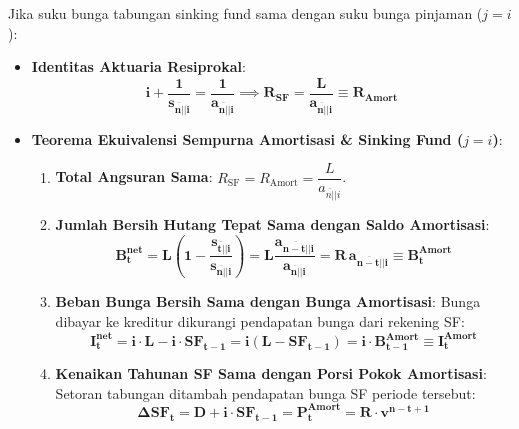 \documentclass[10pt,a4paper]{article}
\newcommand{\angl}[1]{\overline{#1|}}
\begin{document}
\begin{teoremabox}[Kasus 1: Suku Bunga Sinking Fund Sama dengan Bunga Hutang ($j = i$)]
Jika suku bunga tabungan sinking fund sama dengan suku bunga pinjaman ($j = i$):
\begin{itemize}[leftmargin=1.5em, topsep=1.5pt, itemsep=2pt]
    \item \textbf{Identitas Aktuaria Resiprokal}:
    \begin{equation*}
        \mathbf{i + \frac{1}{s_{\angl{n}|i}} = \frac{1}{a_{\angl{n}|i}}} \implies \mathbf{R_{\text{SF}} = \frac{L}{a_{\angl{n}|i}} \equiv R_{\text{Amort}}}
    \end{equation*}
    \item \textbf{Teorema Ekuivalensi Sempurna Amortisasi \& Sinking Fund ($j = i$)}:
    \begin{enumerate}[label=(\alph*), topsep=1pt, itemsep=1.5pt]
        \item \textbf{Total Angsuran Sama}: $R_{\text{SF}} = R_{\text{Amort}} = \dfrac{L}{a_{\angl{n}|i}}$.
        \item \textbf{Jumlah Bersih Hutang Tepat Sama dengan Saldo Amortisasi}:
        \begin{equation*}
            \mathbf{B_t^{\text{net}} = L \left( 1 - \frac{s_{\angl{t}|i}}{s_{\angl{n}|i}} \right) = L \frac{a_{\angl{n-t}|i}}{a_{\angl{n}|i}} = R \, a_{\angl{n-t}|i} \equiv B_t^{\text{Amort}}}
        \end{equation*}
        \item \textbf{Beban Bunga Bersih Sama dengan Bunga Amortisasi}:
        Bunga dibayar ke kreditur dikurangi pendapatan bunga dari rekening SF:
        \begin{equation*}
            \mathbf{I_t^{\text{net}} = i \cdot L - i \cdot SF_{t-1} = i(L - SF_{t-1}) = i \cdot B_{t-1}^{\text{Amort}} \equiv I_t^{\text{Amort}}}
        \end{equation*}
        \item \textbf{Kenaikan Tahunan SF Sama dengan Porsi Pokok Amortisasi}:
        Setoran tabungan ditambah pendapatan bunga SF periode tersebut:
        \begin{equation*}
            \mathbf{\Delta SF_t = D + i \cdot SF_{t-1} = P_t^{\text{Amort}} = R \cdot v^{n-t+1}}
        \end{equation*}
    \end{enumerate}
\end{itemize}
\end{teoremabox}
\end{document}
